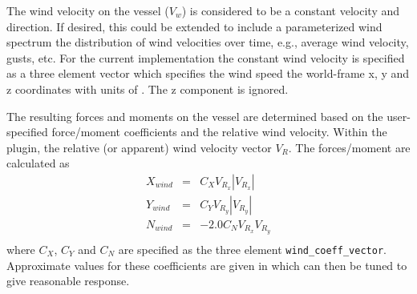 \documentclass[11pt]{article}
\begin{document}
The wind velocity on the vessel ($V_w$) is considered to be a constant velocity and direction.  If desired, this could be extended to include a parameterized wind spectrum the distribution of wind velocities over time, e.g., average wind velocity, gusts, etc.  For the current implementation the constant wind velocity is specified as a three element vector which specifies the wind speed the world-frame x, y and z coordinates with units of .  The z component is ignored.

The resulting forces and moments on the vessel are determined based on the user-specified force/moment coefficients and the relative wind velocity.  Within the plugin, the relative (or apparent) wind velocity vector $V_R$.  The forces/moment are calculated as
\begin{eqnarray}
  X_{wind} &=& C_X V_{R_x} |V_{R_x}| \\
  Y_{wind} &=& C_Y V_{R_y} |V_{R_y}| \\
  N_{wind} &=& -2.0 C_N V_{R_x} V_{R_y} \\
\end{eqnarray}
where $C_X$, $C_Y$ and $C_N$ are specified as the three element \verb+wind_coeff_vector+.  Approximate values for these coefficients are given in \cite{sarda17station} which can then be tuned to give reasonable response.



\end{document}
